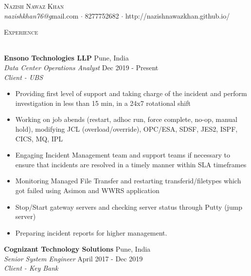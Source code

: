 \documentclass[a4paper]{article}
\newcommand{\lineunder} {
    \vspace*{-8pt} \\
    \hspace*{-18pt} \hrulefill \\
}
\newcommand{\header} [1] {
    {\hspace*{-18pt}\vspace*{6pt} \textsc{#1}}
    \vspace*{-6pt} \lineunder
}
\begin{document}
\vspace*{-40pt}

    

\vspace*{-10pt}
\begin{center}
	{\Huge \scshape {Nazish Nawaz Khan}}\\
	\vspace{2mm}
	{\emph{nazishkhan76@g}}mail.com $\cdot$ 8277752682 $\cdot$ http://nazishnawazkhan.github.io/\\
\end{center}

{\color{blue}\header{Experience}}

\vspace{1mm}

\textbf{Ensono Technologies LLP} \hfill Pune, India\\
\textit{Data Center Operations Analyst} \hfill Dec 2019 - Present\\
\textit{Client - UBS} 
\vspace{-1mm}
\justify
\begin{itemize} \itemsep 1pt

	\item Providing first level of support and taking charge of the incident and perform investigation in less than 15 min, in a 24x7 rotational shift
	\item Working on job abends (restart, adhoc run, force complete, no-op, manual hold), modifying JCL (overload/override), OPC/ESA, SDSF, JES2, ISPF, CICS, MQ, IPL
	\item Engaging Incident Management team and support teams if necessary to ensure that incidents are resolved in a timely manner within SLA timeframes 
	\item Monitoring Managed File Transfer and restarting transferid/filetypes which got failed using Asimon and WWRS application
	\item Stop/Start gateway servers and checking server status through Putty (jump server)
           \item Preparing incident reports for higher management.
\end{itemize}
\vspace{2mm}
\textbf{Cognizant Technology Solutions} \hfill Pune, India\\
\textit{Senior System Engineer} \hfill April 2017 - Dec 2019\\
\textit{Client - Key Bank} 
\vspace{-1mm}
\end{document}
